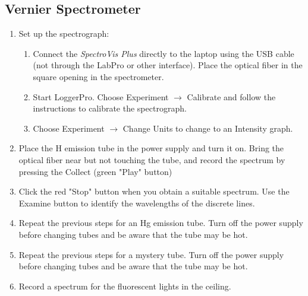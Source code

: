 \subsection{Vernier Spectrometer}

\begin{enumerate}
\item Set up the spectrograph:
\begin{enumerate}
\item Connect the \textit{SpectroVis Plus} directly to the laptop using the USB
  cable (not through the LabPro or other interface).  Place the optical fiber in
  the square opening in the spectrometer.

\item Start LoggerPro.  Choose Experiment $\rightarrow$ Calibrate and follow the
  instructions to calibrate the spectrograph.
  
\item Choose Experiment $\rightarrow$ Change Units to change to an Intensity
  graph.
\end{enumerate}

\item Place the H emission tube in the power supply and turn it on.  Bring the
  optical fiber near but not touching the tube, and record the spectrum by
  pressing the Collect (green "Play" button) 
\item Click the red "Stop" button when you obtain a suitable spectrum.  Use the
  Examine button to identify the wavelengths of the discrete lines. 
\item Repeat the previous steps for an Hg emission tube.  Turn off the power
  supply before changing tubes and be aware that the tube may be hot. 
\item Repeat the previous steps for a mystery tube.  Turn off the power supply
  before changing tubes and be aware that the tube may be hot. 
\item Record a spectrum for the fluorescent lights in the ceiling.    
\end{enumerate}


